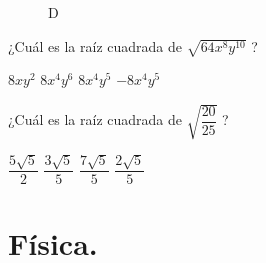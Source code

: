 \documentclass[14pt]{exam}
\begin{document}
\begin{questions}
\begin{minipage}{0.4\linewidth}
\begin{figure}[H]
    \caption{D}
\end{figure}
\end{minipage}
\question ¿Cuál es la raíz cuadrada de $\sqrt{64 x^{8} y^{10}}$ \quad?
\\[0.5em]
\begin{oneparchoices}
    \choice $8 x y^{2}$
    \choice $8 x^{4} y^{6}$
    \choice $8 x^{4} y^{5}$
    \choice $-8 x^{4} y^{5}$
\end{oneparchoices}
\question ¿Cuál es la raíz cuadrada de $\sqrt{\dfrac{20}{25}}$ \quad?
\\[0.5em]
\begin{oneparchoices}
    \choice $\dfrac{5 \sqrt{5}}{2}$
    \choice $\dfrac{3 \sqrt{5}}{5}$
    \choice $\dfrac{7 \sqrt{5}}{5}$
    \choice $\dfrac{2 \sqrt{5}}{5}$
\end{oneparchoices}
\end{questions}

\section{Física.}
\end{document}
